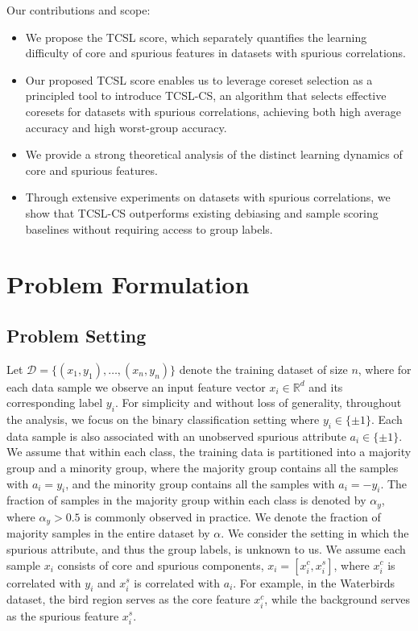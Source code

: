 \documentclass[letter,11pt]{article}
\begin{document}
Our contributions and scope: 
\begin{itemize}
    \item We propose the TCSL score, which separately quantifies the learning difficulty of core and spurious features in datasets with spurious correlations.
    \item Our proposed TCSL score enables us to leverage coreset selection as a principled tool to introduce TCSL-CS, an algorithm that selects effective coresets for datasets with spurious correlations, achieving both high average accuracy and high worst-group accuracy.
    \item We provide a strong theoretical analysis of the distinct learning dynamics of core and spurious features.
    \item Through extensive experiments on datasets with spurious correlations, we show that TCSL-CS outperforms existing debiasing and sample scoring baselines without requiring access to group labels.
\end{itemize}





\section{Problem Formulation}

\subsection{Problem Setting}\label{sec:problem_setting}

Let $\mathcal{D}\!=\!\{(x_1, y_1), \dots, (x_n, y_n)\}$ denote the training dataset of size $n$, where for each data sample we observe an input feature vector $x_i \in \mathbb{R}^d$ and its corresponding label $y_i$. For simplicity and without loss of generality, throughout the analysis, we focus on the binary classification setting where $y_i \in \{\pm1\}$. Each data sample is also associated with an unobserved spurious attribute $a_i \in \{\pm1\}$. We assume that within each class, the training data is partitioned into a majority group and a minority group, where the majority group contains all the samples with $a_i = y_i$, and the minority group contains all the samples with $a_i=-y_i$. The fraction of samples in the majority group within each class is denoted by $\alpha_y$, where $\alpha_y>0.5$ is commonly observed in practice. We denote the fraction of majority samples in the entire dataset by $\alpha$. We consider the setting in which the spurious attribute, and thus the group labels, is unknown to us. We assume each sample $x_i$ consists of core and spurious components, $x_i = [x_i^c, x_i^s]$, where $x_i^c$ is correlated with $y_i$ and $x_i^s$ is correlated with $a_i$. For example, in the Waterbirds~\citep{Waterbirds} dataset, the bird region serves as the core feature $x_i^c$, while the background serves as the spurious feature $x_i^s$.
\end{document}
